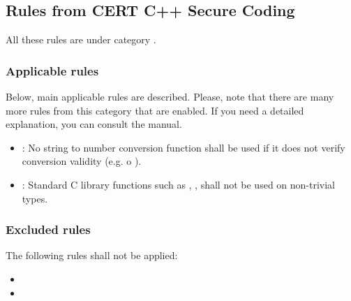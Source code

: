 \subsection{Rules from CERT C++ Secure Coding}

All these rules are under category
.

\subsubsection{Applicable rules}

Below, main applicable rules are described.
Please, note that there are many more rules from this category that are enabled.
If you need a detailed explanation, you can consult the  manual. 

\begin{itemize}

\item {}:
No string to number conversion function shall be used if
it does not verify conversion validity (e.g.   o ).

\item {}:
Standard C library functions such as
, ,  
shall not be used on non-trivial types.

\end{itemize}

\subsubsection{Excluded rules}

The following rules shall not be applied:

\begin{itemize}

\item {}
\item {}

\end{itemize}

